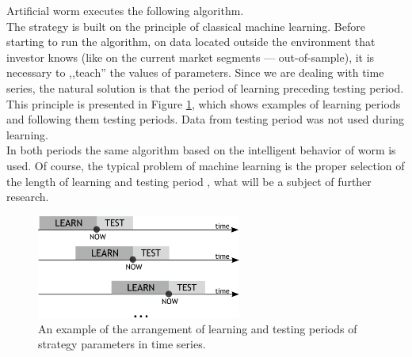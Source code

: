 \documentclass[runningheads,a4paper]{llncs}
\begin{document}
Artificial worm executes the following algorithm.\\
The strategy is built on the principle of classical machine learning. Before starting to run the algorithm, on data located outside the environment that investor knows (like on the current market segments --- out-of-sample), it is necessary to ,,teach''  the values of parameters. Since we are dealing with time series,  the natural solution is that the period of learning preceding testing period.  This principle is presented in Figure \ref{fig:fig2}, which shows examples of learning periods and following them testing periods. Data from testing period was not used during learning.\\
In both periods the same algorithm based on the intelligent behavior of worm is used. Of course, the typical problem of machine learning is the proper selection of the length of learning and testing period \cite{bishop2006pattern}, what will be a subject of further research.\\
\begin{figure}[ht]
\centering
\includegraphics[width = 0.6\textwidth]{figures/rys2.png}
\caption{An example of the arrangement of learning and testing periods of strategy parameters in time series.}
\label{fig:fig2}
\end{figure}
\FloatBarrier
\end{document}
